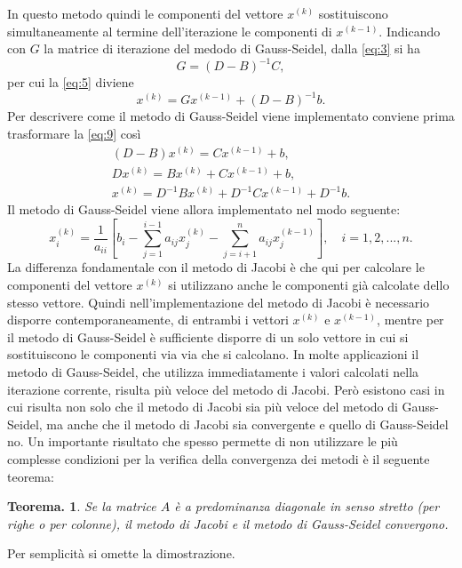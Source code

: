 \documentclass[12pt]{article}
\newtheorem*{remark}{Teorema.}
\begin{document}
In questo metodo quindi le componenti del vettore \(x^{(k)}\) sostituiscono simultaneamente al termine dell'iterazione le componenti di \(x^{(k-1)}\).
Indicando con \(G\) la matrice di iterazione del medodo di Gauss-Seidel, dalla \eqref{eq:3} si ha
\begin{equation*}
    G=(D-B)^{-1}C,
\end{equation*}
per cui la \eqref{eq:5} diviene
\begin{equation}
    \label{eq:9}
    x^{(k)}=Gx^{(k-1)}+(D-B)^{-1}b.
\end{equation}
Per descrivere come il metodo di Gauss-Seidel viene implementato conviene prima trasformare la \eqref{eq:9} così
\begin{gather*}
    (D-B)x^{(k)}=Cx^{(k-1)}+b, \\
    Dx^{(k)}=Bx^{(k)}+Cx^{(k-1)}+b, \\
    x^{(k)}=D^{-1}Bx^{(k)}+D^{-1}Cx^{(k-1)}+D^{-1}b.
\end{gather*}
Il metodo di Gauss-Seidel viene allora implementato nel modo seguente:
\begin{equation}
    \label{eq:10}
    x^{(k)}_i= \frac{1}{a_{ii}} \left[ b_i-\sum^{i-1}_{j=1} a_{ij}x^{(k)}_{j} - \sum^{n}_{j=i+1} a_{ij}x^{(k-1)}_j \right], \quad i=1,2,...,n.
\end{equation}
La differenza fondamentale con il metodo di Jacobi è che qui per calcolare le componenti del vettore \(x^{(k)}\) si utilizzano anche le componenti già calcolate dello stesso vettore. Quindi nell'implementazione del metodo di Jacobi è necessario disporre contemporaneamente, di entrambi i vettori \(x^{(k)}\) e \(x^{(k-1)}\), mentre per il metodo di Gauss-Seidel è sufficiente disporre di un solo vettore in cui si sostituiscono le componenti via via che si calcolano.
In molte applicazioni il metodo di Gauss-Seidel, che utilizza immediatamente i valori calcolati nella iterazione corrente, risulta più veloce del metodo di Jacobi. Però esistono casi in cui risulta non solo che il metodo di Jacobi sia più veloce del metodo di Gauss-Seidel, ma anche che il metodo di Jacobi sia convergente e quello di Gauss-Seidel no.
Un importante risultato che spesso permette di non utilizzare le più complesse condizioni per la verifica della convergenza dei metodi è il seguente teorema:
\begin{remark}
Se la matrice \(A\) è a predominanza diagonale in senso stretto (per righe o per colonne), il metodo di Jacobi e il metodo di Gauss-Seidel convergono.
\end{remark}
Per semplicità si omette la dimostrazione.
\end{document}

